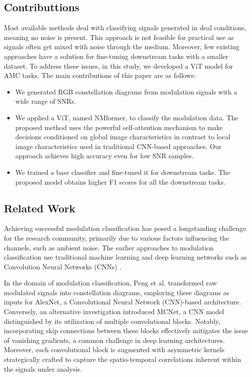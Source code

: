 \subsection{Contributtions}

Most available methods \cite{peng2018modulation, 8454504} deal with classifying signals generated in deal conditions, meaning no noise is present. This approach is not feasible for practical use as signals often get mixed with noise through the medium. Moreover, few existing approaches \cite{hong2017automatic, ramjee2019fast} have a solution for fine-tuning downstream tasks with a smaller dataset. To address these issues, in this study, we developed a ViT model for AMC tasks. The main contributions of this paper are as follows:

\begin{itemize}
    \item We generated RGB constellation diagrams from modulation signals with a wide range of SNRs.
    \item We applied a ViT, named NMformer, to classify the modulation data. The proposed method uses the powerful self-attention mechanism to make decisions conditioned on global image characteristics in contrast to local image characteristics used in traditional CNN-based approaches. Our approach achieves high accuracy even for low SNR samples. 
    \item We trained a base classifier and fine-tuned it for downstream tasks. The proposed model obtains higher F1 scores for all the downstream tasks. 
\end{itemize}

\subsection{Related Work}

Achieving successful modulation classification has posed a longstanding challenge for the research community, primarily due to various factors influencing the channels, such as ambient noise. The earlier approaches to modulation classification use traditional machine learning and deep learning networks such as Convolution Neural Networks (CNNs) \cite{peng2017modulation,8963964,10139474}. 

In the domain of modulation classification, Peng et al. \cite{peng2017modulation} transformed raw modulated signals into constellation diagrams, employing these diagrams as inputs for AlexNet, a Convolutional Neural Network (CNN)-based architecture. Conversely, an alternative investigation \cite{8963964} introduced MCNet, a CNN model distinguished by its utilization of multiple convolutional blocks. Notably, incorporating skip connections between these blocks effectively mitigates the issue of vanishing gradients, a common challenge in deep learning architectures. Moreover, each convolutional block is augmented with asymmetric kernels strategically crafted to capture the spatio-temporal correlations inherent within the signals under analysis.


